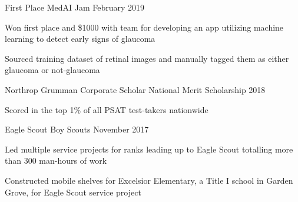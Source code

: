 
\begin{cventries}
  \cventry
    {First Place} %
    {MedAI Jam} %
    {} %
    {February 2019} %
    {
      \begin{cvitems}
        \item {Won first place and \$1000 with team for developing an app utilizing machine learning to detect early signs of glaucoma}
        \item {Sourced training dataset of retinal images and manually tagged them as either glaucoma or not-glaucoma}
      \end{cvitems}
    } %

  \cventry
    {Northrop Grumman Corporate Scholar}
    {National Merit Scholarship}
    {}
    {2018}
    {
      \begin{cvitems}
        \item {Scored in the top 1\% of all PSAT test-takers nationwide}
      \end{cvitems}
    }  
    
  \cventry
    {Eagle Scout}
    {Boy Scouts}
    {}
    {November 2017}
    {
      \begin{cvitems}
        \item {Led multiple service projects for ranks leading up to Eagle Scout totalling more than 300 man-hours of work}
        \item {Constructed mobile shelves for Excelsior Elementary, a Title I school in Garden Grove, for Eagle Scout service project}
      \end{cvitems}
    }

\end{cventries}
